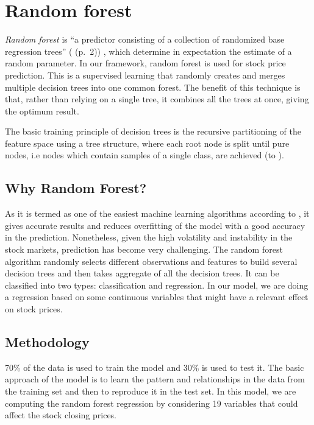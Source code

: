 \documentclass[
  11pt,
]{article}
\begin{document}
\hypertarget{random-forest}{%
\section{Random forest}\label{random-forest}}

\emph{Random forest} is ``a predictor consisting of a collection of
randomized base regression trees'' (\citet{Biau2012} (p.~2)) , which
determine in expectation the estimate of a random parameter. In our
framework, random forest is used for stock price prediction. This is a
supervised learning that randomly creates and merges multiple decision
trees into one common forest. The benefit of this technique is that,
rather than relying on a single tree, it combines all the trees at once,
giving the optimum result.

The basic training principle of decision trees is the recursive
partitioning of the feature space using a tree structure, where each
root node is split until pure nodes, i.e nodes which contain samples of
a single class, are achieved (to \citet{Denil2014}).

\hypertarget{why-random-forest}{%
\subsection{Why Random Forest?}\label{why-random-forest}}

As it is termed as one of the easiest machine learning algorithms
according to \citet{HibaSadia2019}, it gives accurate results and
reduces overfitting of the model with a good accuracy in the prediction.
Nonetheless, given the high volatility and instability in the stock
markets, prediction has become very challenging. The random forest
algorithm randomly selects different observations and features to build
several decision trees and then takes aggregate of all the decision
trees. It can be classified into two types: classification and
regression. In our model, we are doing a regression based on some
continuous variables that might have a relevant effect on stock prices.

\hypertarget{methodology}{%
\subsection{Methodology}\label{methodology}}

70\% of the data is used to train the model and 30\% is used to test it.
The basic approach of the model is to learn the pattern and
relationships in the data from the training set and then to reproduce it
in the test set. In this model, we are computing the random forest
regression by considering 19 variables that could affect the stock
closing prices.
\end{document}
